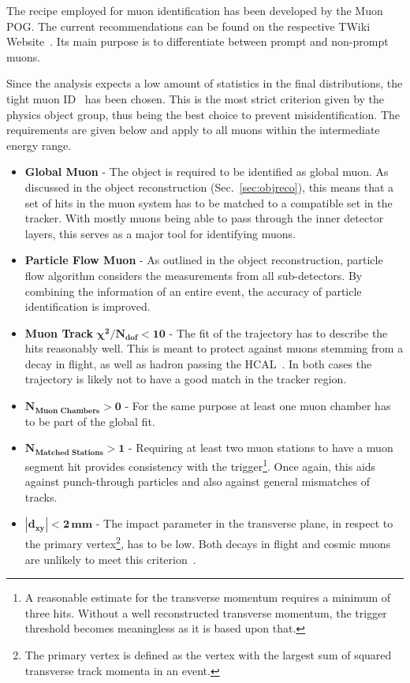 The recipe employed for muon identification has been developed by the Muon POG. The current recommendations can be found on the respective TWiki Website~\cite{muonpog}. Its main purpose is to differentiate between prompt and non-prompt muons.

Since the analysis expects a low amount of statistics in the final distributions, the tight muon ID~\cite{muonid1, muonid2} has been chosen. This is the most strict criterion given by the physics object group, thus being the best choice to prevent misidentification. The requirements are given below and apply to all muons within the intermediate energy range.

\begin{itemize}
\item \textbf{Global Muon} - The object is required to be identified as global muon. As discussed in the object reconstruction (Sec.~\ref{sec:objreco}), this means that a set of hits in the muon system has to be matched to a compatible set in the tracker. With mostly muons being able to pass through the inner detector layers, this serves as a major tool for identifying muons.
\item \textbf{Particle Flow Muon} - As outlined in the object reconstruction, particle flow algorithm considers the measurements from all sub-detectors. By combining the information of an entire event, the accuracy of particle identification is improved.
\item \textbf{Muon Track} $\mathbf{\chi^2 / N_{\textbf{dof}} < 10}$ - The fit of the trajectory has to describe the hits reasonably well. This is meant to protect against muons stemming from a decay in flight, as well as hadron passing the HCAL~\cite{muonidcosmic}. In both cases the trajectory is likely not to have a good match in the tracker region.
\item $\mathbf{N_{\textbf{Muon Chambers}} > 0}$ - For the same purpose at least one muon chamber has to be part of the global fit. 
\item $\mathbf{N_{\textbf{Matched Stations}} > 1}$ - Requiring at least two muon stations to have a muon segment hit provides consistency with the trigger\footnote{A reasonable estimate for the transverse momentum requires a minimum of three hits. Without a well reconstructed transverse momentum, the trigger threshold becomes meaningless as it is based upon that.}. Once again, this aids against punch-through particles and also against general mismatches of tracks.
\item $\mathbf{|d_{xy}| < 2\,\textbf{mm}}$ - The impact parameter in the transverse plane, in respect to the primary vertex\footnote{The primary vertex is defined as the vertex with the largest sum of squared transverse track momenta in an event.}, has to be low. Both decays in flight and cosmic muons are unlikely to meet this criterion~\cite{muonidcosmic}.

\end{itemize}
